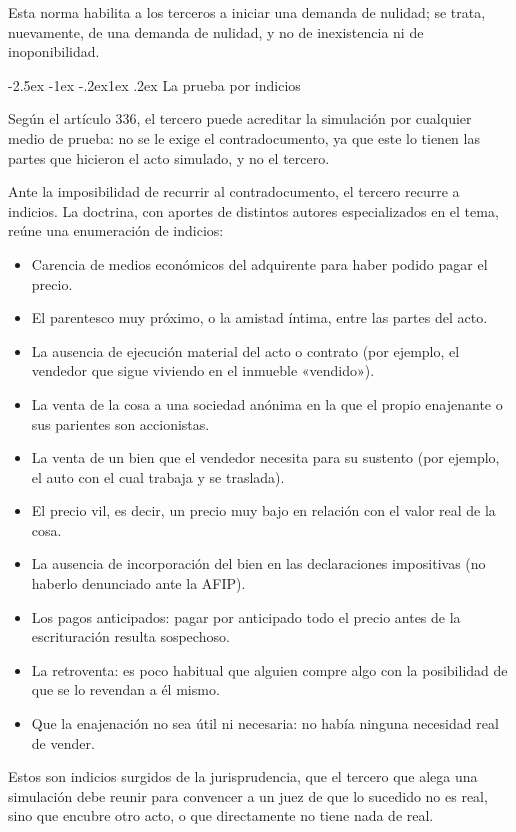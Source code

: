\documentclass[12pt,oneside]{book}
\makeatletter
\renewcommand\subsection{\@startsection{subsection}{2}{\z@}%
  {-2.5ex \@plus -1ex \@minus -.2ex}{1ex \@plus .2ex}%
  {\normalfont\normalsize\bfseries}}
\makeatother
\begin{document}
Esta norma habilita a los terceros a iniciar una demanda de nulidad; se trata, nuevamente, de una demanda de nulidad, y no de inexistencia ni de inoponibilidad.

\subsection{La prueba por indicios}

Según el artículo 336, el tercero puede acreditar la simulación por cualquier medio de prueba: no se le exige el contradocumento, ya que este lo tienen las partes que hicieron el acto simulado, y no el tercero.

Ante la imposibilidad de recurrir al contradocumento, el tercero recurre a indicios. La doctrina, con aportes de distintos autores especializados en el tema, reúne una enumeración de indicios:

\begin{itemize}
    \item Carencia de medios económicos del adquirente para haber podido pagar el precio.
    \item El parentesco muy próximo, o la amistad íntima, entre las partes del acto.
    \item La ausencia de ejecución material del acto o contrato (por ejemplo, el vendedor que sigue viviendo en el inmueble «vendido»).
    \item La venta de la cosa a una sociedad anónima en la que el propio enajenante o sus parientes son accionistas.
    \item La venta de un bien que el vendedor necesita para su sustento (por ejemplo, el auto con el cual trabaja y se traslada).
    \item El precio vil, es decir, un precio muy bajo en relación con el valor real de la cosa.
    \item La ausencia de incorporación del bien en las declaraciones impositivas (no haberlo denunciado ante la AFIP).
    \item Los pagos anticipados: pagar por anticipado todo el precio antes de la escrituración resulta sospechoso.
    \item La retroventa: es poco habitual que alguien compre algo con la posibilidad de que se lo revendan a él mismo.
    \item Que la enajenación no sea útil ni necesaria: no había ninguna necesidad real de vender.
\end{itemize}

Estos son indicios surgidos de la jurisprudencia, que el tercero que alega una simulación debe reunir para convencer a un juez de que lo sucedido no es real, sino que encubre otro acto, o que directamente no tiene nada de real.
\end{document}
